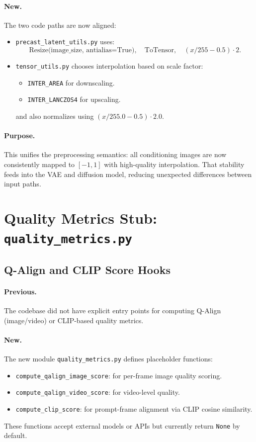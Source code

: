 \documentclass[11pt,a4paper]{article}
\newcommand{\file}[1]{\texttt{#1}}
\newcommand{\fn}[1]{\texttt{#1}}
\begin{document}
\paragraph{New.}
The two code paths are now aligned:
\begin{itemize}
    \item \file{precast\_latent\_utils.py} uses:
    \[
        \text{Resize(image\_size, antialias=True)},\quad
        \text{ToTensor},\quad
        (x/255 - 0.5)\cdot 2.
    \]
    \item \file{tensor\_utils.py} chooses interpolation based on scale factor:
    \begin{itemize}[nosep]
        \item \fn{INTER\_AREA} for downscaling.
        \item \fn{INTER\_LANCZOS4} for upscaling.
    \end{itemize}
    and also normalizes using \((x/255.0 - 0.5)\cdot 2.0\).
\end{itemize}

\paragraph{Purpose.}
This unifies the preprocessing semantics:
all conditioning images are now consistently mapped to \([-1,1]\) with high-quality interpolation.
That stability feeds into the VAE and diffusion model, reducing unexpected differences between input paths.

\section{Quality Metrics Stub: \file{quality\_metrics.py}}

\subsection{Q-Align and CLIP Score Hooks}

\paragraph{Previous.}
The codebase did not have explicit entry points for computing Q-Align (image/video) or CLIP-based quality metrics.

\paragraph{New.}
The new module \file{quality\_metrics.py} defines placeholder functions:
\begin{itemize}
    \item \fn{compute\_qalign\_image\_score}: for per-frame image quality scoring.
    \item \fn{compute\_qalign\_video\_score}: for video-level quality.
    \item \fn{compute\_clip\_score}: for prompt-frame alignment via CLIP cosine similarity.
\end{itemize}
These functions accept external models or APIs but currently return \fn{None} by default.
\end{document}
